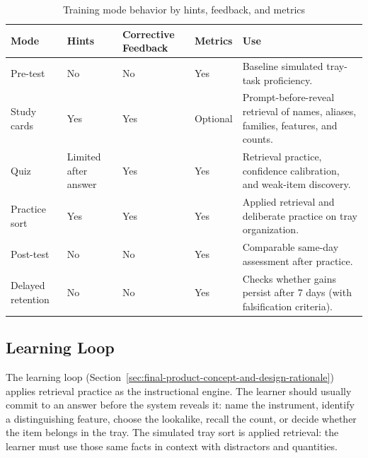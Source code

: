 \documentclass[10pt,a4paper]{article}
\begin{document}
\begin{table}[H]
\centering
\caption{Training mode behavior by hints, feedback, and metrics}
\label{tab:training-mode-behavior-by-hints-feedback-and-metrics}
\small\renewcommand{\arraystretch}{1.2}\setlength{\tabcolsep}{4pt}
\begin{tabularx}{\textwidth}{|>{\raggedright\arraybackslash}X|>{\raggedright\arraybackslash}X|>{\raggedright\arraybackslash}X|>{\raggedright\arraybackslash}X|>{\raggedright\arraybackslash}X|}
\hline
Mode & Hints & Corrective Feedback & Metrics & Use \\
\hline
Pre-test & No & No & Yes & Baseline simulated tray-task proficiency. \\
\hline
Study cards & Yes & Yes & Optional & Prompt-before-reveal retrieval of names, aliases, families, features, and counts. \\
\hline
Quiz & Limited after answer & Yes & Yes & Retrieval practice, confidence calibration, and weak-item discovery. \\
\hline
Practice sort & Yes & Yes & Yes & Applied retrieval and deliberate practice on tray organization. \\
\hline
Post-test & No & No & Yes & Comparable same-day assessment after practice. \\
\hline
Delayed retention & No & No & Yes & Checks whether gains persist after 7 days (with falsification criteria). \\
\hline
\end{tabularx}
\end{table}
\subsection{Learning Loop}


The learning loop (Section~\ref{sec:final-product-concept-and-design-rationale}) applies retrieval practice as the instructional engine. The learner should usually
commit to an answer before the system reveals it: name the instrument, identify
a distinguishing feature, choose the lookalike, recall the count, or decide
whether the item belongs in the tray. The simulated tray sort is applied
retrieval: the learner must use those same facts in context with distractors
and quantities.
\end{document}
